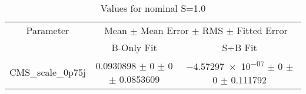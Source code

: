 \begin{table}
\centering
\caption{Values for nominal S=1.0}
\begin{tabular}{ccc}
\toprule
Parameter & \multicolumn{2}{c}{Mean $\pm$ Mean Error $\pm$ RMS $\pm$ Fitted Error}\\
 & B-Only Fit & S+B Fit\\
\midrule
CMS\_scale\_0p75j & \num{0.0930898} $\pm$ \num{0} $\pm$ \num{0} $\pm$ \num{0.0853609} & \num{-4.57297e-07} $\pm$ \num{0} $\pm$ \num{0} $\pm$ \num{0.111792}\\
\bottomrule
\end{tabular}
\end{table}